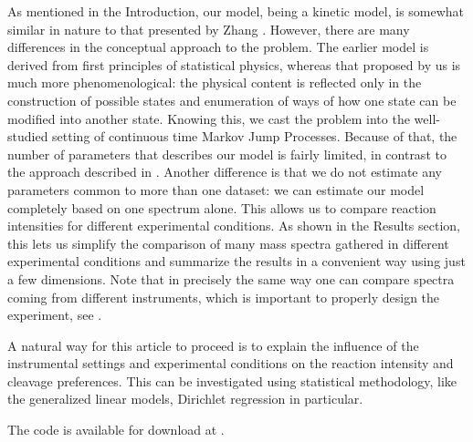 \documentclass{llncs}
\begin{document}
As mentioned in the Introduction, our model, being a kinetic model, is somewhat similar in nature to that presented by Zhang \cite{Zhang2010-fp}. However, there are many differences in the conceptual approach to the problem. The earlier model is derived from first principles of statistical physics, whereas that proposed by us is much more phenomenological: the physical content is reflected only in the construction of possible states and enumeration of ways of how one state can be modified into another state. Knowing this, we cast the problem into the well-studied setting of continuous time Markov Jump Processes. Because of that, the number of parameters that describes our model is fairly limited, in contrast to the approach described in  \cite{Zhang2010-fp}. Another difference is that we do not estimate any parameters common to more than one dataset: we can estimate our model completely based on one spectrum alone. This allows us to compare reaction intensities for different experimental conditions. As shown in the Results section, this lets us simplify the comparison of many mass spectra gathered in different experimental conditions and summarize the results in a convenient way using just a few dimensions. Note that in precisely the same way one can compare spectra coming from different instruments, which is important to properly design the experiment, see \cite{Lermyte2015-lm}.

A natural way for this article to proceed is to explain the influence of the instrumental settings and experimental conditions on the reaction intensity and cleavage preferences. This can be investigated using statistical methodology, like the generalized linear models, Dirichlet regression in particular.

The code is available for download at \url{}.

\end{document}
